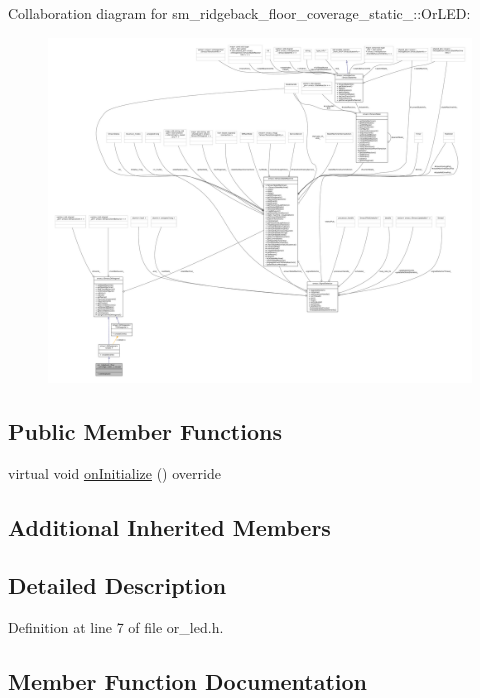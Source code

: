 Collaboration diagram for sm\+\_\+ridgeback\+\_\+floor\+\_\+coverage\+\_\+static\+\_\+:\+:Or\+L\+ED\+:
\nopagebreak
\begin{figure}[H]
\begin{center}
\leavevmode
\includegraphics[width=350pt]{classsm__ridgeback__floor__coverage__static__1_1_1OrLED__coll__graph}
\end{center}
\end{figure}
\subsection*{Public Member Functions}
\begin{DoxyCompactItemize}
\item 
virtual void \hyperlink{classsm__ridgeback__floor__coverage__static__1_1_1OrLED_af9bd0d065de558ff0b33adec30523e06}{on\+Initialize} () override
\end{DoxyCompactItemize}
\subsection*{Additional Inherited Members}


\subsection{Detailed Description}


Definition at line 7 of file or\+\_\+led.\+h.



\subsection{Member Function Documentation}
\mbox{\label{classsm__ridgeback__floor__coverage__static__1_1_1OrLED_af9bd0d065de558ff0b33adec30523e06}} 
